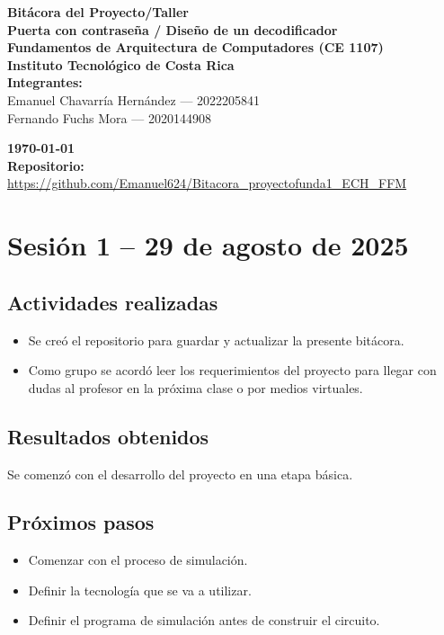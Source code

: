 \documentclass[12pt,letterpaper]{article}
\begin{document}
\begin{center}
    \textbf{\LARGE{Bitácora del Proyecto/Taller}} \\[6mm]
    \textbf{\large{Puerta con contraseña / Diseño de un decodificador}} \\[4mm]
    \textbf{\large{Fundamentos de Arquitectura de Computadores (CE 1107)}} \\[4mm]
    \textbf{\large{Instituto Tecnológico de Costa Rica}} \\[6mm]

    \textbf{Integrantes:} \\[4mm]
    Emanuel Chavarría Hernández — 2022205841 \\[2mm]
    Fernando Fuchs Mora — 2020144908

    \textbf{\today}\\[8mm]
    \textbf{Repositorio:} \\[2mm]
    \url{https://github.com/Emanuel624/Bitacora_proyectofunda1_ECH_FFM}
\end{center}



\section{Sesión 1 -- 29 de agosto de 2025}
\subsection*{Actividades realizadas}
\begin{itemize}
    \item Se creó el repositorio para guardar y actualizar la presente bitácora.
    \item Como grupo se acordó leer los requerimientos del proyecto para llegar con dudas al profesor en la próxima clase o por medios virtuales.
\end{itemize}

\subsection*{Resultados obtenidos}
Se comenzó con el desarrollo del proyecto en una etapa básica.

\subsection*{Próximos pasos}
\begin{itemize}
    \item Comenzar con el proceso de simulación.
    \item Definir la tecnología que se va a utilizar.
    \item Definir el programa de simulación antes de construir el circuito.
\end{itemize}
\end{document}
